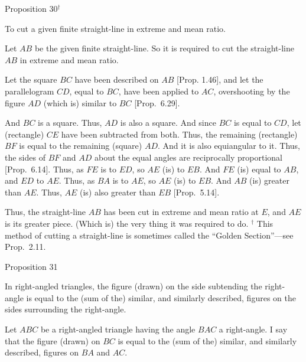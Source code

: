 \begin{center}
{\large Proposition 30}$^\dag$
\end{center}

To cut a given finite straight-line in extreme and
mean ratio.

\epsfysize=2.2in
\centerline{}

Let $AB$ be the given finite straight-line. So it is required to cut the straight-line $AB$ in extreme and mean ratio.

Let the square $BC$ have been described on $AB$  [Prop. 1.46],
and let the parallelogram $CD$, equal to $BC$, have been applied to $AC$,
overshooting by the figure $AD$ (which is) similar to $BC$ [Prop.~6.29].

And $BC$ is a square. Thus, $AD$ is also a square. And since $BC$ is equal to
$CD$, let (rectangle) $CE$ have been subtracted from both. Thus, the remaining (rectangle) $BF$
is equal to the remaining (square) $AD$. And it is also equiangular to it. 
Thus, the sides of $BF$ and $AD$ about the equal angles are reciprocally proportional [Prop.~6.14]. 
Thus, as $FE$ is to $ED$, so $AE$ (is) to $EB$. And $FE$ (is) equal to $AB$, and $ED$ to
$AE$. Thus, as $BA$ is to $AE$, so $AE$ (is) to $EB$.  And $AB$ (is)
 greater than $AE$. Thus, $AE$ (is) also greater than $EB$ [Prop.~5.14].
 
 Thus, the straight-line $AB$ has been cut in extreme and mean ratio at $E$,
 and $AE$ is its greater piece. (Which is) the very thing it was required to
 do.
{\footnotesize\noindent$^\dag$ This method of cutting a straight-line
is sometimes called the ``Golden Section''---see Prop.~2.11.}


\begin{center}
{\large Proposition 31}
\end{center}

In right-angled triangles, the figure (drawn)
on the side subtending the right-angle is equal to the (sum of the) similar, and similarly
described, figures on the sides surrounding the right-angle.

\epsfysize=2in
\centerline{}

Let $ABC$ be a right-angled triangle having the angle $BAC$ a right-angle. I say
that the figure (drawn) on $BC$ is equal to the (sum of the) similar,
and similarly described, figures on $BA$ and $AC$.

